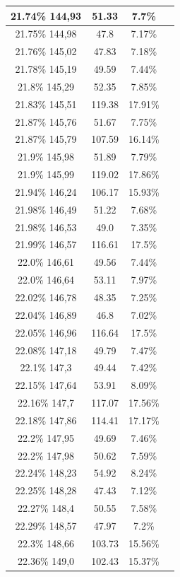 \begin{center}
\begin{longtable}{|c|c|c|c|}
21.74\% 144,93 & 51.33 & 7.7\%  \\ \hline
21.75\% 144,98 & 47.8 & 7.17\%  \\ \hline
21.76\% 145,02 & 47.83 & 7.18\%  \\ \hline
21.78\% 145,19 & 49.59 & 7.44\%  \\ \hline
21.8\% 145,29 & 52.35 & 7.85\%  \\ \hline
21.83\% 145,51 & 119.38 & 17.91\%  \\ \hline
21.87\% 145,76 & 51.67 & 7.75\%  \\ \hline
21.87\% 145,79 & 107.59 & 16.14\%  \\ \hline
21.9\% 145,98 & 51.89 & 7.79\%  \\ \hline
21.9\% 145,99 & 119.02 & 17.86\%  \\ \hline
21.94\% 146,24 & 106.17 & 15.93\%  \\ \hline
21.98\% 146,49 & 51.22 & 7.68\%  \\ \hline
21.98\% 146,53 & 49.0 & 7.35\%  \\ \hline
21.99\% 146,57 & 116.61 & 17.5\%  \\ \hline
22.0\% 146,61 & 49.56 & 7.44\%  \\ \hline
22.0\% 146,64 & 53.11 & 7.97\%  \\ \hline
22.02\% 146,78 & 48.35 & 7.25\%  \\ \hline
22.04\% 146,89 & 46.8 & 7.02\%  \\ \hline
22.05\% 146,96 & 116.64 & 17.5\%  \\ \hline
22.08\% 147,18 & 49.79 & 7.47\%  \\ \hline
22.1\% 147,3 & 49.44 & 7.42\%  \\ \hline
22.15\% 147,64 & 53.91 & 8.09\%  \\ \hline
22.16\% 147,7 & 117.07 & 17.56\%  \\ \hline
22.18\% 147,86 & 114.41 & 17.17\%  \\ \hline
22.2\% 147,95 & 49.69 & 7.46\%  \\ \hline
22.2\% 147,98 & 50.62 & 7.59\%  \\ \hline
22.24\% 148,23 & 54.92 & 8.24\%  \\ \hline
22.25\% 148,28 & 47.43 & 7.12\%  \\ \hline
22.27\% 148,4 & 50.55 & 7.58\%  \\ \hline
22.29\% 148,57 & 47.97 & 7.2\%  \\ \hline
22.3\% 148,66 & 103.73 & 15.56\%  \\ \hline
22.36\% 149,0 & 102.43 & 15.37\%  \\ \hline

\end{longtable}
\end{center}
